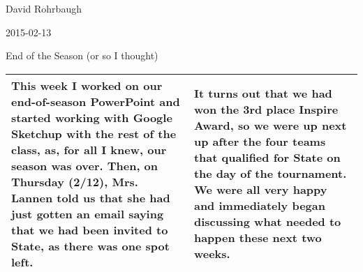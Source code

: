 David Rohrbaugh

2015-02-13

End of the Season (or so I thought)

\begin{tabular}{|p{5cm}|p{5cm}|}
 \hline
 This week I worked on our end-of-season PowerPoint and started working with Google Sketchup with the rest of the class, as, for all I knew, our season was over. Then, on Thursday (2/12), Mrs. Lannen told us that she had just gotten an email saying that we had been invited to State, as there was one spot left.
 &
  It turns out that we had won the 3rd place Inspire Award, so we were up next up after the four teams that qualified for State on the day of the tournament. We were all very happy and immediately began discussing what needed to happen these next two weeks.
 \\
 \hline
\end{tabular}

